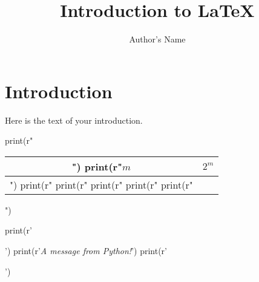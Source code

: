 \documentclass{article}
\begin{document}
\title{Introduction to \LaTeX{}}
\author{Author's Name}

\maketitle

\section{Introduction}
Here is the text of your introduction.


\begin{pycode}
print(r"\begin{tabular}{c|c}")
print(r"$m$ & $2^m$ \\ \hline")
print(r"%
print(r"%
print(r"%
print(r"%
print(r"\end{tabular}")
\end{pycode}

\begin{pycode}
print(r'\begin{center}')
print(r'\textit{A message from Python!}')
print(r'\end{center}')
\end{pycode}


\end{document}

